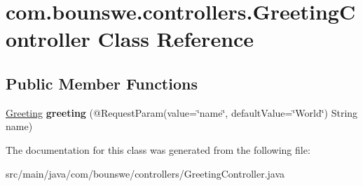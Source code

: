 \hypertarget{classcom_1_1bounswe_1_1controllers_1_1_greeting_controller}{}\section{com.\+bounswe.\+controllers.\+Greeting\+Controller Class Reference}
\label{classcom_1_1bounswe_1_1controllers_1_1_greeting_controller}
\subsection*{Public Member Functions}
\begin{DoxyCompactItemize}
\item 
\mbox{\label{classcom_1_1bounswe_1_1controllers_1_1_greeting_controller_ae24a1e261096fe0f4f9bab2ca0f45206}} 
\hyperlink{classcom_1_1bounswe_1_1models_1_1_greeting}{Greeting} {\bfseries greeting} (@Request\+Param(value=\char`\"{}name\char`\"{}, default\+Value=\char`\"{}World\char`\"{}) String name)
\end{DoxyCompactItemize}


The documentation for this class was generated from the following file\+:\begin{DoxyCompactItemize}
\item 
src/main/java/com/bounswe/controllers/Greeting\+Controller.\+java\end{DoxyCompactItemize}
